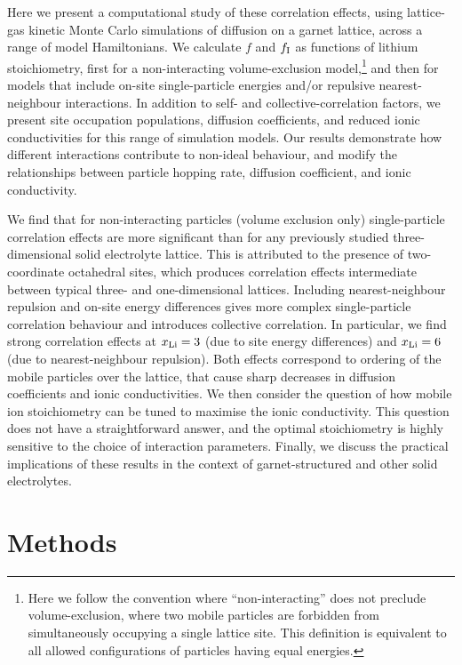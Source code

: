 \documentclass[aps,prb,twocolumn,superscriptaddress,reprint]{revtex4-1}
\newcommand{\xLi}{x_\m{Li}}
\begin{document}
Here we present a computational study of these correlation effects, using lattice-gas kinetic Monte Carlo simulations of diffusion on a garnet lattice, across a range of model Hamiltonians. 
We calculate $f$ and $f_{\mathrm{I}}$ as functions of lithium stoichiometry, first for a non-interacting volume-exclusion model,\footnote{Here we follow the convention where ``non-interacting'' does not preclude volume-exclusion, where two mobile particles are forbidden from simultaneously occupying a single lattice site.\cite{Kutner_PhysLett1981} This definition is equivalent to all allowed configurations of particles having equal energies.} and then for models that include on-site single-particle energies and/or repulsive nearest-neighbour interactions. 
In addition to self- and collective-correlation factors, we present site occupation populations, diffusion coefficients, and reduced ionic conductivities for this range of simulation models. Our results demonstrate how different interactions contribute to non-ideal behaviour, and modify the relationships between particle hopping rate, diffusion coefficient, and ionic conductivity. 

We find that for non-interacting particles (volume exclusion only) single-particle correlation effects are more significant than for any previously studied three-dimensional solid electrolyte lattice. This is attributed to the presence of two-coordinate octahedral sites, which produces correlation effects intermediate between typical three- and one-dimensional lattices. Including nearest-neighbour repulsion and on-site energy differences gives more complex single-particle correlation behaviour and introduces collective correlation. In particular, we find strong correlation effects at $\xLi=3$ (due to site energy differences) and $\xLi=6$ (due to nearest-neighbour repulsion). Both effects correspond to ordering of the mobile particles over the lattice, that cause sharp decreases in diffusion coefficients and ionic conductivities. We then consider the question of how mobile ion stoichiometry can be tuned to maximise the ionic conductivity. This question does not have a straightforward answer, and the optimal stoichiometry is highly sensitive to the choice of interaction parameters. Finally, we discuss the practical implications of these results in the context of garnet-structured and other solid electrolytes.

\section{Methods}
\end{document}
